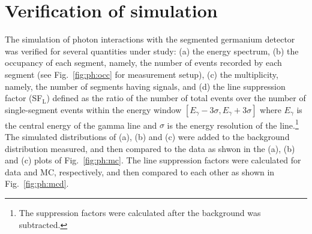 \section{Verification of simulation}
\label{sec:ph:var}
The simulation of photon interactions with the segmented germanium detector was verified for several quantities under study: (a) the energy spectrum, (b) the occupancy of each segment, namely, the number of events recorded by each segment (see Fig.~\ref{fig:ph:occ} for measurement setup), (c) the multiplicity, namely, the number of segments having signals, and (d) the line suppression factor (SF$_{\text{L}}$) defined as the ratio of the number of total events over the number of single-segment events within the energy window $[E_{\gamma} - 3\sigma, E_{\gamma} + 3\sigma]$ where $E_{\gamma}$ is the central energy of the gamma line and $\sigma$ is the energy resolution of the line.\footnote{The suppression factors were calculated after the background was subtracted.} The simulated distributions of (a), (b) and (c) were added to the background distribution measured, and then compared to the data as shwon in the (a), (b) and (c) plots of Fig.~\ref{fig:ph:mc}. The line suppression factors were calculated for data and MC, respectively, and then compared to each other as shown in Fig.~\ref{fig:ph:mcd}.

